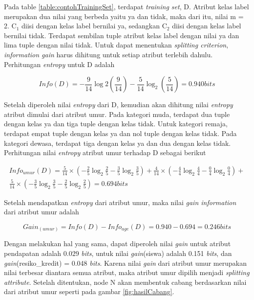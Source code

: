 Pada table \ref{table:contohTrainingSet}, terdapat \textsl{training set}, D. Atribut kelas label merupakan dua nilai yang berbeda yaitu ya dan tidak, maka dari itu, nilai m = 2. C$_{1}$ diisi dengan kelas label bernilai ya, sedangkan C$_{2}$ diisi dengan kelas label bernilai tidak. Terdapat sembilan tuple atribut kelas label dengan nilai ya dan lima tuple dengan nilai tidak. Untuk dapat menentukan \textsl{splitting criterion}, \textsl{information gain} harus dihitung untuk setiap atribut terlebih dahulu. Perhitungan \textsl{entropy} untuk D adalah

\begin{displaymath}
	Info(D) = - \frac{9}{14}\log2(\frac{9}{14}) - \frac{5}{14}\log_2(\frac{5}{14}) = 0.940 bits
\end{displaymath}

Setelah diperoleh nilai \textsl{entropy} dari D, kemudian akan dihitung nilai \textsl{entropy} atribut dimulai dari atribut umur. Pada kategori muda, terdapat dua tuple dengan kelas ya dan tiga tuple dengan kelas tidak. Untuk kategori remaja, terdapat empat tuple dengan kelas ya dan nol tuple dengan kelas tidak. Pada kategori dewasa, terdapat tiga dengan kelas ya dan dua dengan kelas tidak. Perhitungan nilai \textsl{entropy} atribut umur terhadap D sebagai berikut

\begin{align*}
	Info_{umur}(D) = \frac{5}{14} \times (-\frac{2}{5}\log_2\frac{2}{5} - \frac{3}{5}\log_2\frac{3}{5}) + \frac{4}{14} \times (-\frac{4}{4}\log_2\frac{4}{4} - \frac{0}{4}\log_2\frac{0}{4}) + \\
	\frac{5}{14} \times (-\frac{3}{5}\log_2\frac{3}{5} - \frac{2}{5}\log_2\frac{2}{5}) = 0.694 bits
\end{align*}

Setelah mendapatkan \textsl{entropy} dari atribut umur, maka nilai \textsl{gain information} dari atribut umur adalah

\begin{displaymath}
	Gain_{(umur)} = Info(D) - Info_{age}(D) = 0.940 - 0.694 = 0.246 bits
\end{displaymath}

Dengan melakukan hal yang sama, dapat diperoleh nilai \textsl{gain} untuk atribut pendapatan adalah 0.029 \textsl{bits}, untuk nilai \textsl{gain}(siswa) adalah 0.151 \textsl{bits}, dan \textsl{gain}(resiko\_kredit) = 0.048 \textsl{bits}. Karena nilai \textsl{gain} dari atribut umur merupakan nilai terbesar diantara semua atribut, maka atribut umur dipilih menjadi \textsl{splitting attribute}. Setelah ditentukan, node N akan membentuk cabang berdasarkan nilai dari atribut umur seperti pada gambar \ref{fig:hasilCabang}.


